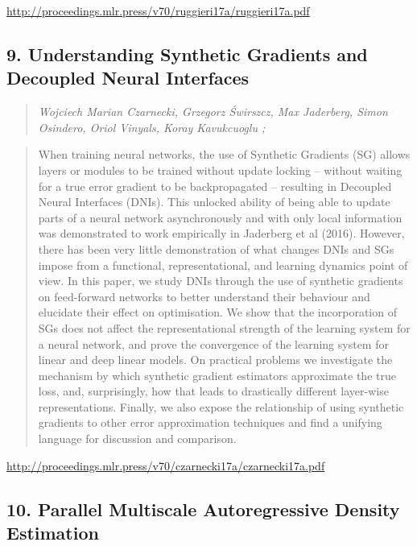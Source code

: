 \documentclass{article}
\begin{document}
\href{http://proceedings.mlr.press/v70/ruggieri17a/ruggieri17a.pdf}{http://proceedings.mlr.press/v70/ruggieri17a/ruggieri17a.pdf}

\subsection{9. Understanding Synthetic Gradients and Decoupled Neural Interfaces}

\begin{quote}
\footnotesize{\textit{Wojciech Marian Czarnecki, Grzegorz Świrszcz, Max Jaderberg, Simon Osindero, Oriol Vinyals, Koray Kavukcuoglu ;}}

\end{quote}

\begin{quote}
    When training neural networks, the use of Synthetic Gradients (SG) allows layers or modules to be trained without update locking – without waiting for a true error gradient to be backpropagated – resulting in Decoupled Neural Interfaces (DNIs). This unlocked ability of being able to update parts of a neural network asynchronously and with only local information was demonstrated to work empirically in Jaderberg et al (2016). However, there has been very little demonstration of what changes DNIs and SGs impose from a functional, representational, and learning dynamics point of view. In this paper, we study DNIs through the use of synthetic gradients on feed-forward networks to better understand their behaviour and elucidate their effect on optimisation. We show that the incorporation of SGs does not affect the representational strength of the learning system for a neural network, and prove the convergence of the learning system for linear and deep linear models. On practical problems we investigate the mechanism by which synthetic gradient estimators approximate the true loss, and, surprisingly, how that leads to drastically different layer-wise representations. Finally, we also expose the relationship of using synthetic gradients to other error approximation techniques and find a unifying language for discussion and comparison.  
\end{quote}

\href{http://proceedings.mlr.press/v70/czarnecki17a/czarnecki17a.pdf}{http://proceedings.mlr.press/v70/czarnecki17a/czarnecki17a.pdf}

\subsection{10. Parallel Multiscale Autoregressive Density Estimation}
\end{document}
